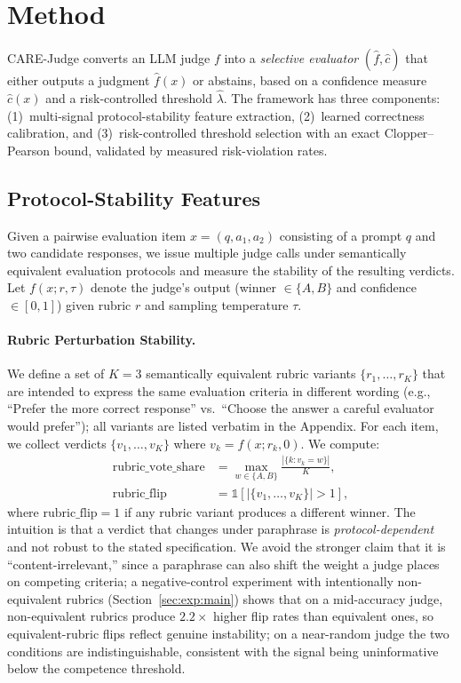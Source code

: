 
\section{Method}
\label{sec:method}

CARE-Judge converts an LLM judge $f$ into a \emph{selective evaluator} $(\hat{f}, \hat{c})$ that either outputs a judgment $\hat{f}(x)$ or abstains, based on a confidence measure $\hat{c}(x)$ and a risk-controlled threshold $\hat{\lambda}$.
The framework has three components: (1)~multi-signal protocol-stability feature extraction, (2)~learned correctness calibration, and (3)~risk-controlled threshold selection with an exact Clopper--Pearson bound, validated by measured risk-violation rates.

\subsection{Protocol-Stability Features}
\label{sec:method:features}

Given a pairwise evaluation item $x = (q, a_1, a_2)$ consisting of a prompt $q$ and two candidate responses, we issue multiple judge calls under semantically equivalent evaluation protocols and measure the stability of the resulting verdicts.
Let $f(x; r, \tau)$ denote the judge's output (winner $\in\{A, B\}$ and confidence $\in[0,1]$) given rubric $r$ and sampling temperature $\tau$.

\paragraph{Rubric Perturbation Stability.}
We define a set of $K=3$ semantically equivalent rubric variants $\{r_1, \ldots, r_K\}$ that are intended to express the same evaluation criteria in different wording (e.g., ``Prefer the more correct response'' vs.\ ``Choose the answer a careful evaluator would prefer''); all variants are listed verbatim in the Appendix.
For each item, we collect verdicts $\{v_1, \ldots, v_K\}$ where $v_k = f(x; r_k, 0)$.
We compute:
\begin{align}
    \text{rubric\_vote\_share} &= \max_{w \in \{A,B\}} \frac{|\{k : v_k = w\}|}{K}, \label{eq:rubric_share} \\
    \text{rubric\_flip} &= \mathbb{1}\!\left[|\{v_1, \ldots, v_K\}| > 1\right], \label{eq:rubric_flip}
\end{align}
where $\text{rubric\_flip} = 1$ if any rubric variant produces a different winner.
The intuition is that a verdict that changes under paraphrase is \emph{protocol-dependent} and not robust to the stated specification. We avoid the stronger claim that it is ``content-irrelevant,'' since a paraphrase can also shift the weight a judge places on competing criteria; a negative-control experiment with intentionally non-equivalent rubrics (Section~\ref{sec:exp:main}) shows that on a mid-accuracy judge, non-equivalent rubrics produce $2.2\times$ higher flip rates than equivalent ones, so equivalent-rubric flips reflect genuine instability; on a near-random judge the two conditions are indistinguishable, consistent with the signal being uninformative below the competence threshold.

